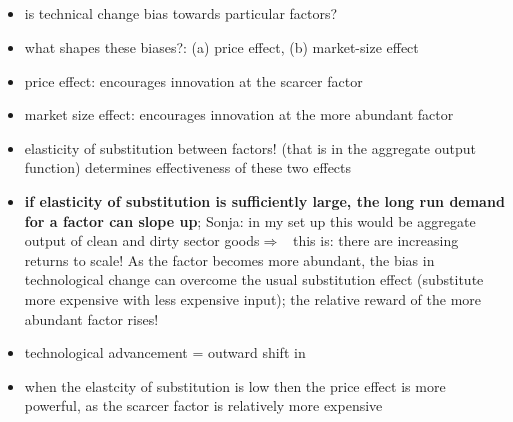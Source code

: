 \documentclass[12pt]{article}
\newcommand{\ar}{$\Rightarrow$ \ }
\begin{document}
\subsection{\cite{Acemoglu2002DirectedChange}}
\begin{itemize}
 \item is technical change bias towards particular factors? 
 \item what shapes these biases?: (a) price effect, (b) market-size effect
 \item price effect: encourages innovation at the scarcer factor
 \item market size effect: encourages innovation at the more abundant factor
 \item elasticity of substitution between factors! (that is in the aggregate output function) determines effectiveness of these two effects
 \item \textbf{if elasticity of substitution is sufficiently large, the long run demand for a factor can slope up}; Sonja: in my set up this would be aggregate output of clean and dirty sector goods\ar this is: there are increasing returns to scale! As the factor becomes more abundant, the bias in technological change can overcome the usual substitution effect (substitute more expensive with less expensive input); the relative reward of the more abundant factor rises! 
 \item technological advancement = outward shift in 
 \item when the elastcity of substitution is low then the price effect is more powerful, as the scarcer factor is relatively more expensive 
\end{itemize}
\end{document}
